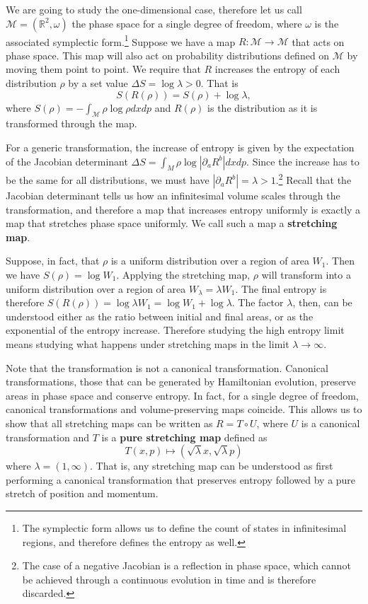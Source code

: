 \documentclass{article}
\begin{document}
We are going to study the one-dimensional case, therefore let us call $\mathcal{M} = (\mathbb{R}^2, \omega)$ the phase space for a single degree of freedom, where $\omega$ is the associated symplectic form.\footnote{The symplectic form allows us to define the count of states in infinitesimal regions, and therefore defines the entropy as well.} Suppose we have a map $R : \mathcal{M} \to \mathcal{M}$ that acts on phase space. This map will also act on probability distributions defined on $\mathcal{M}$ by moving them point to point. We require that $R$ increases the entropy of each distribution $\rho$ by a set value $\Delta S = \log \lambda > 0$. That is
\begin{equation}
S(R(\rho)) = S(\rho) + \log \lambda,
\end{equation}
where $S(\rho) = - \int_{\mathcal{M}} \rho \log \rho dx dp$ and $R(\rho)$ is the distribution as it is transformed through the map.

For a generic transformation, the increase of entropy is given by the expectation of the Jacobian determinant $\Delta S =\int_M \rho \log |\partial_a R^b| dxdp$. Since the increase has to be the same for all distributions, we must have $|\partial_a R^b| = \lambda > 1$.\footnote{The case of a negative Jacobian is a reflection in phase space, which cannot be achieved through a continuous evolution in time and is therefore discarded.} Recall that the Jacobian determinant tells us how an infinitesimal volume scales through the transformation, and therefore a map that increases entropy uniformly is exactly a map that stretches phase space uniformly. We call such a map a \textbf{stretching map}.

Suppose, in fact, that $\rho$ is a uniform distribution over a region of area $W_1$. Then we have $S(\rho)= \log W_1$. Applying the stretching map, $\rho$ will transform into a uniform distribution over a region of area $W_{\lambda} = \lambda W_1$. The final entropy is therefore $S(R(\rho)) = \log \lambda W_1 = \log W_1 + \log \lambda$. The factor $\lambda$, then, can be understood either as the ratio between initial and final areas, or as the exponential of the entropy increase. Therefore studying the high entropy limit means studying what happens under stretching maps in the limit $\lambda \to \infty$.

Note that the transformation is not a canonical transformation. Canonical transformations, those that can be generated by Hamiltonian evolution, preserve areas in phase space and conserve entropy. In fact, for a single degree of freedom, canonical transformations and volume-preserving maps coincide. This allows us to show that all stretching maps can be written as $R = T \circ U$, where $U$ is a canonical transformation and $T$ is a \textbf{pure stretching map} defined as
\begin{equation}
    T(x,p) \mapsto (\sqrt{\lambda} x, \sqrt{\lambda} p)
\end{equation}
where $\lambda = (1,\infty)$. That is, any stretching map can be understood as first performing a canonical transformation that preserves entropy followed by a pure stretch of position and momentum.
\end{document}
